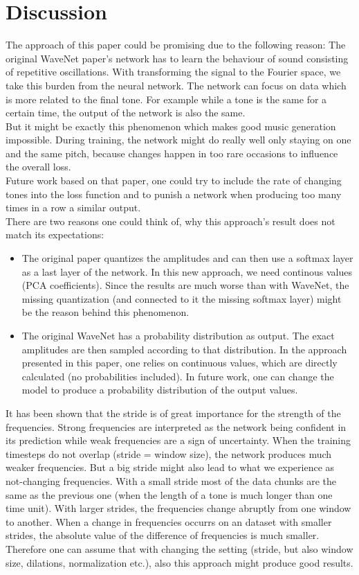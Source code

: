 \documentclass[10pt,conference,compsocconf]{IEEEtran}
\begin{document}
\section{Discussion}
The approach of this paper could be promising due to the following reason: The original WaveNet paper's network has to learn the behaviour of sound consisting of repetitive oscillations. With transforming the signal to the Fourier space, we take this burden from the neural network. The network can focus on data which is more related to the final tone. For example while a tone is the same for a certain time, the output of the network is also the same.\\
But it might be exactly this phenomenon which makes good music generation impossible. During training, the network might do really well only staying on one and the same pitch, because changes happen in too rare occasions to influence the overall loss.\\
Future work based on that paper, one could try to include the rate of changing tones into the loss function and to punish a network when producing too many times in a row a similar output.\\
There are two reasons one could think of, why this approach's result does not match its expectations:
\begin{itemize}
  \item The original paper quantizes the amplitudes and can then use a softmax layer as a last layer of the network. In this new approach, we need continous values (PCA coefficients). Since the results are much worse than with WaveNet, the missing quantization (and connected to it the missing softmax layer) might be the reason behind this phenomenon.
  \item The original WaveNet has a probability distribution as output. The exact amplitudes are then sampled according to that distribution. In the approach presented in this paper, one relies on continuous values, which are directly calculated (no probabilities included). In future work, one can change the model to produce a probability distribution of the output values.
\end{itemize}

It has been shown that the stride is of great importance for the strength of the frequencies. Strong frequencies are interpreted as the network being confident in its prediction while weak frequencies are a sign of uncertainty. When the training timesteps do not overlap (stride = window size), the network produces much weaker frequencies. But a big stride might also lead to what we experience as not-changing frequencies. With a small stride most of the data chunks are the same as the previous one (when the length of a tone is much longer than one time unit). With larger strides, the frequencies change abruptly from one window to another. When a change in frequencies occurrs on an dataset with smaller strides, the absolute value of the difference of frequencies is much smaller.\\
Therefore one can assume that with changing the setting (stride, but also window size, dilations, normalization etc.), also this approach might produce good results.
\end{document}

